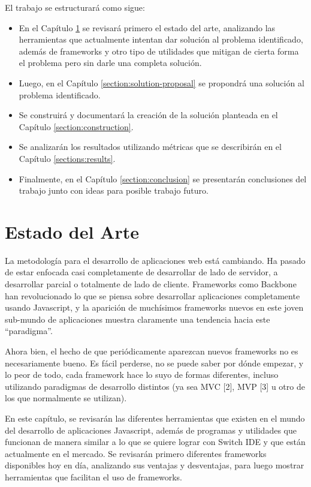 \documentclass[12pt,spanish,letter]{report}
\begin{document}
El trabajo se estructurará como sigue:

\begin{itemize}
\item
  En el Capítulo \ref{section:state-of-the-art} se revisará primero el
  estado del arte, analizando las herramientas que actualmente intentan
  dar solución al problema identificado, además de frameworks y otro
  tipo de utilidades que mitigan de cierta forma el problema pero sin
  darle una completa solución.
\item
  Luego, en el Capítulo \ref{section:solution-proposal} se propondrá una
  solución al problema identificado.
\item
  Se construirá y documentará la creación de la solución planteada en el
  Capítulo \ref{section:construction}.
\item
  Se analizarán los resultados utilizando métricas que se describirán en
  el Capítulo \ref{sections:results}.
\item
  Finalmente, en el Capítulo \ref{section:conclusion} se presentarán
  conclusiones del trabajo junto con ideas para posible trabajo futuro.
\end{itemize}

\clearpage
\newpage

\chapter{Estado del Arte}

\label{section:state-of-the-art}

La metodología para el desarrollo de aplicaciones web está cambiando. Ha
pasado de estar enfocada casi completamente de desarrollar de lado de
servidor, a desarrollar parcial o totalmente de lado de cliente.
Frameworks como Backbone han revolucionado lo que se piensa sobre
desarrollar aplicaciones completamente usando Javascript, y la aparición
de muchísimos frameworks nuevos en este joven sub-mundo de aplicaciones
muestra claramente una tendencia hacia este ``paradigma''.

Ahora bien, el hecho de que periódicamente aparezcan nuevos frameworks
no es necesariamente bueno. Es fácil perderse, no se puede saber por
dónde empezar, y lo peor de todo, cada framework hace lo suyo de formas
diferentes, incluso utilizando paradigmas de desarrollo distintos (ya
sea MVC {[}2{]}, MVP {[}3{]} u otro de los que normalmente se utilizan).

En este capítulo, se revisarán las diferentes herramientas que existen
en el mundo del desarrollo de aplicaciones Javascript, además de
programas y utilidades que funcionan de manera similar a lo que se
quiere lograr con Switch IDE y que están actualmente en el mercado. Se
revisarán primero diferentes frameworks disponibles hoy en día,
analizando sus ventajas y desventajas, para luego mostrar herramientas
que facilitan el uso de frameworks.
\end{document}
